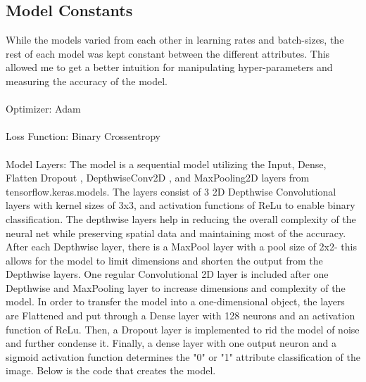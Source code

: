 \documentclass{article}
\begin{document}
\subsection{Model Constants}
While the models varied from each other in learning rates and batch-sizes, the rest of each model was kept constant between the different attributes. This allowed me to get a better intuition for manipulating hyper-parameters and measuring the accuracy of the model. 
\\\\
Optimizer: Adam 
\\\\
Loss Function: Binary Crossentropy
\\\\
Model Layers: The model is a sequential model utilizing the Input, Dense, Flatten Dropout , DepthwiseConv2D , and MaxPooling2D layers from tensorflow.keras.models. The layers consist of 3 2D Depthwise Convolutional layers with kernel sizes of 3x3, and activation functions of ReLu to enable binary classification. The depthwise layers help in reducing the overall complexity of the neural net while preserving spatial data and maintaining most of the accuracy. After each Depthwise layer, there is a MaxPool layer with a pool size of 2x2- this allows for the model to limit dimensions and shorten the output from the Depthwise layers. One regular Convolutional 2D layer is included after one Depthwise and MaxPooling layer to increase dimensions and complexity of the model. In order to transfer the model into a one-dimensional object, the layers are Flattened and put through a Dense layer with 128 neurons and an activation function of ReLu. Then, a Dropout layer is implemented to rid the model of noise and further condense it. Finally, a dense layer with one output neuron and a sigmoid activation function determines the "0" or "1" attribute classification of the image. Below is the code that creates the model.
\end{document}
